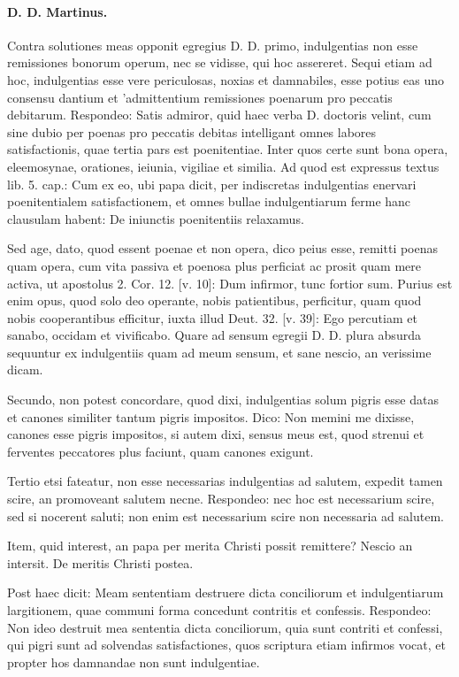 \paragraph*{D. D. Martinus.}

Contra solutiones meas opponit egregius D. D. primo, indulgentias non esse remissiones bonorum operum, nec se vidisse, qui hoc assereret. Sequi \marginpar{\small[354]} etiam ad hoc, indulgentias esse vere periculosas, noxias et damnabiles, esse potius eas uno consensu dantium et 'admittentium remissiones poenarum pro peccatis debitarum. Respondeo: Satis admiror, quid haec verba D. doctoris velint, cum sine dubio per poenas pro peccatis debitas intelligant omnes labores satisfactionis, quae tertia pars est poenitentiae. Inter quos certe sunt bona opera, eleemosynae, orationes, ieiunia, vigiliae et similia. Ad quod est expressus textus lib. 5. cap.: Cum ex eo, ubi papa dicit, per indiscretas indulgentias enervari poenitentialem satisfactionem, et omnes bullae indulgentiarum ferme hanc clausulam habent: De iniunctis poenitentiis relaxamus.

Sed age, dato, quod essent poenae et non opera, dico peius esse, remitti poenas quam opera, cum vita passiva et poenosa plus perficiat ac prosit quam mere activa, ut apostolus 2. Cor. 12. [v. 10]: Dum infirmor, tunc fortior sum. Purius est enim opus, quod solo deo operante, nobis patientibus, perficitur, quam quod nobis cooperantibus efficitur, iuxta illud Deut. 32. [v. 39]: Ego percutiam et sanabo, occidam et vivificabo. Quare ad sensum egregii D. D. plura absurda sequuntur ex indulgentiis quam ad meum sensum, et sane nescio, an verissime dicam.

Secundo, non potest concordare, quod dixi, indulgentias solum pigris esse datas et canones similiter tantum pigris impositos. Dico: Non memini me dixisse, canones esse pigris impositos, si autem dixi, sensus meus est, quod strenui et ferventes peccatores plus faciunt, quam canones exigunt.

Tertio etsi fateatur, non esse necessarias indulgentias ad salutem, expedit tamen scire, an promoveant salutem necne. Respondeo: nec hoc est necessarium scire, sed si nocerent saluti; non enim est necessarium scire non necessaria ad salutem.

Item, quid interest, an papa per merita Christi possit remittere? Nescio an intersit. De meritis Christi postea.

Post haec dicit: Meam sententiam destruere dicta conciliorum et indulgentiarum largitionem, quae communi forma concedunt contritis et confessis. Respondeo: Non ideo destruit mea sententia dicta conciliorum, quia sunt contriti et confessi, qui pigri sunt ad solvendas satisfactiones, quos scriptura etiam infirmos vocat, et propter hos damnandae non sunt indulgentiae.

